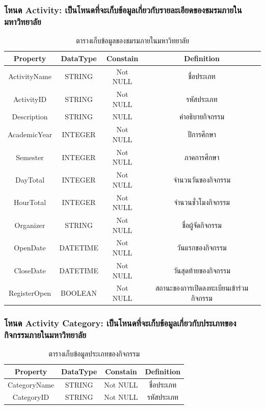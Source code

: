 \documentclass[14pt,oneside,openright,a4paper]{cpe-thai-project}
\begin{document}
    \newpage

    \subsubsection{โหนด Activity: เป็นโหนดที่จะเก็บข้อมูลเกี่ยวกับรายละเอียดของชมรมภายในมหาวิทยาลัย}
    \begin{table}[!h]\centering
      \begin{tabular}{|c|c|c|c|}
      \hline
      \rowcolor[HTML]{9FC5E8} 
      Property     & DataType & Constain & Definition                              \\ \hline
      ActivityName & STRING   & Not NULL & ชื่อประเภท                              \\ \hline
      ActivityID   & STRING   & Not NULL & รหัสประเภท                              \\ \hline
      Description  & STRING   & NULL     & คำอธิบายกิจกรรม                         \\ \hline
      AcademicYear & INTEGER  & Not NULL & ปีการศึกษา                              \\ \hline
      Semester     & INTEGER  & Not NULL & ภาคการศึกษา                             \\ \hline
      DayTotal     & INTEGER  & Not NULL & จำนวนวันของกิจกรรม                      \\ \hline
      HourTotal    & INTEGER  & Not NULL & จำนวนชั่วโมงกิจกรรม                     \\ \hline
      Organizer    & STRING   & Not NULL & ชื่อผู้จัดกิจกรรม                       \\ \hline
      OpenDate     & DATETIME & Not NULL & วันแรกของกิจกรรม                        \\ \hline
      CloseDate    & DATETIME & Not NULL & วันสุดท้ายของกิจกรรม                    \\ \hline
      RegisterOpen & BOOLEAN  & Not NULL & สถานะของการเปิดลงทะเบียนเข้าร่วมกิจกรรม \\ \hline
      \end{tabular}
      \caption{\centering ตารางเก็บข้อมูลของชมรมภายในมหาวิทยาลัย}\label{tab:Activitynode}
    \end{table}
    
    \subsubsection{โหนด Activity Category: เป็นโหนดที่จะเก็บข้อมูลเกี่ยวกับประเภทของกิจกรรมภายในมหาวิทยาลัย}
    \begin{table}[!h]\centering
      \begin{tabular}{|c|c|c|c|}
      \hline
      \rowcolor[HTML]{9FC5E8} 
      Property     & DataType & Constain & Definition \\ \hline
      CategoryName & STRING   & Not NULL & ชื่อประเภท \\ \hline
      CategoryID   & STRING   & Not NULL & รหัสประเภท \\ \hline
      \end{tabular}
      \caption{\centering ตารางเก็บข้อมูลประเภทของกิจกรรม}\label{tab:Activity Category Node}
    \end{table}
\end{document}
